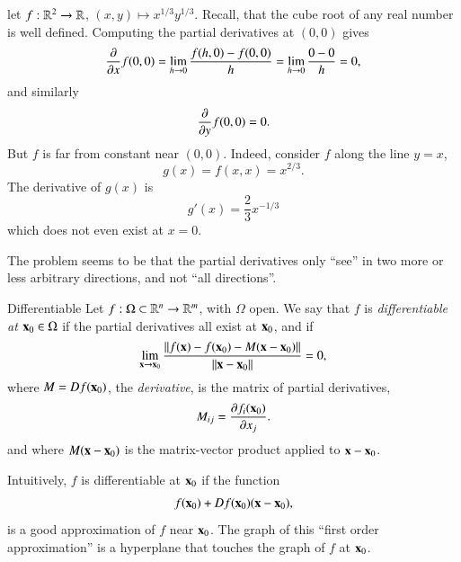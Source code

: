 \begin{myExample}{}{}
    let $f : \mathbb{R}^2 \to \mathbb{R}$, $(x,y)\mapsto x^{1/3} y^{1/3}$. Recall, that the cube root of any real number is well defined. Computing the partial derivatives at $(0,0)$ gives
    \begin{equation}
        \frac{\partial }{\partial x} f(0,0) = \lim_{h\to 0} \frac{f(h,0)-f(0,0)}{h} = \lim_{h\to 0} \frac{0 - 0}{h} = 0,
    \end{equation}
    and similarly
    \begin{equation}
        \frac{\partial }{\partial y} f(0,0) = 0.
    \end{equation}
    But $f$ is far from constant near $(0,0)$. Indeed, consider $f$ along the line $y=x$,
    \begin{equation}
        g(x) = f(x,x) = x^{2/3}.
    \end{equation}
    The derivative of $g(x)$ is
    \begin{equation}
        g'(x) = \frac{2}{3} x^{-1/3}
    \end{equation}
    which does not even exist at $x=0$. 
\end{myExample}
The problem seems to be that the partial derivatives only ``see'' in two more or less arbitrary directions, and not ``all directions''.

\begin{myDefinition}{Differentiable}{}
    Let $f : \Omega \subset \mathbb{R}^n \to \mathbb{R}^m$, with $\Omega$ open. We say that $f$ is \emph{differentiable at $\mathbf{x}_0\in\Omega$} if the partial derivatives all exist at $\mathbf{x}_0$, and if
    \begin{equation}
        \lim_{\mathbf{x}\to\mathbf{x}_0} \frac{\| f(\mathbf{x}) - f(\mathbf{x}_0) - M(\mathbf{x}-\mathbf{x}_0)\|}{\|\mathbf{x}-\mathbf{x}_0\|} = 0,
    \end{equation}
    where $M = Df(\mathbf{x}_0)$, the \emph{derivative}, is the matrix of partial derivatives, 
    \begin{equation}
        M_{ij} = \frac{\partial f_i(\mathbf{x}_0)}{\partial x_j}.
    \end{equation}
    and where $M(\mathbf{x}-\mathbf{x}_0)$ is the matrix-vector product applied to $\mathbf{x}-\mathbf{x}_0$.

\end{myDefinition}

Intuitively, $f$ is differentiable at $\mathbf{x}_0$ if the function
\begin{equation}
    f(\mathbf{x}_0) + Df(\mathbf{x}_0)(\mathbf{x}-\mathbf{x}_0),
\end{equation}
is a good approximation of $f$ near $\mathbf{x}_0$. The graph of this ``first order approximation'' is a hyperplane that touches the graph of $f$ at $\mathbf{x}_0$.

